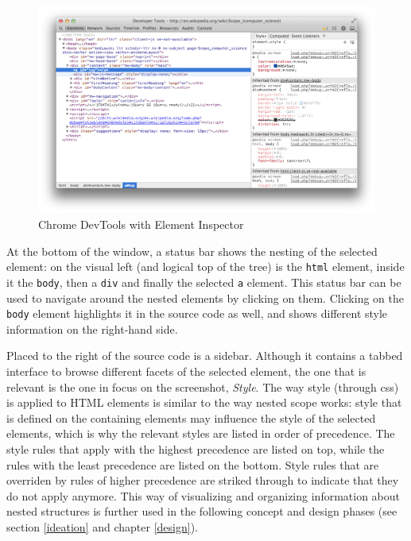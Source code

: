 \begin{figure}[htbp]
\centering
\includegraphics[keepaspectratio,width=\textwidth,height=0.75\textheight]{img/devtools.png}
\caption{Chrome DevTools with Element Inspector}
\label{fig:devtools}
\end{figure}

At the bottom of the window, a status bar shows the nesting of the
selected element: on the visual left (and logical top of the tree) is
the \texttt{html} element, inside it the \texttt{body}, then a
\texttt{div} and finally the selected \texttt{a} element. This status
bar can be used to navigate around the nested elements by clicking on
them. Clicking on the \texttt{body} element highlights it in the source
code as well, and shows different style information on the right-hand
side.

Placed to the right of the source code is a sidebar. Although it
contains a tabbed interface to browse different facets of the selected
element, the one that is relevant is the one in focus on the screenshot,
\emph{Style}. The way style (through \ac{css}) is applied to HTML
elements is similar to the way nested scope works: style that is defined
on the containing elements may influence the style of the selected
elements, which is why the relevant styles are listed in order of
precedence. The style rules that apply with the highest precedence are
listed on top, while the rules with the least precedence are listed on
the bottom. Style rules that are overriden by rules of higher precedence
are striked through to indicate that they do not apply anymore. This way
of visualizing and organizing information about nested structures is
further used in the following concept and design phases (see section
\ref{ideation} and chapter \ref{design}).

